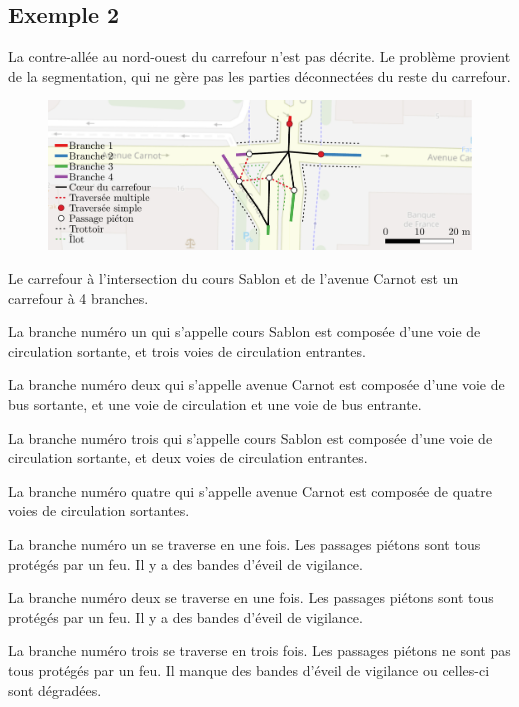 \begin{appendix}
\newpage
\section*{Exemple 2}

La contre-allée au nord-ouest du carrefour n'est pas décrite. Le problème provient de la segmentation, qui ne gère pas les parties déconnectées du reste du carrefour.

\begin{figure}[ht]
  \centering
  \includegraphics[width=\textwidth]{images/annexes/carrefour_master.pdf}
  \label{fig:exemple2}
\end{figure}

Le carrefour à l'intersection du cours Sablon et de l'avenue Carnot est un carrefour à 4 branches.

\newpar{}

La branche numéro un qui s'appelle cours Sablon est composée d'une voie de circulation sortante, et trois voies de circulation entrantes.

La branche numéro deux qui s'appelle avenue Carnot est composée d'une voie de bus sortante, et une voie de circulation et une voie de bus entrante.

La branche numéro trois qui s'appelle cours Sablon est composée d'une voie de circulation sortante, et deux voies de circulation entrantes.

La branche numéro quatre qui s'appelle avenue Carnot est composée de quatre voies de circulation sortantes.

\newpar{}

La branche numéro un se traverse en une fois. Les passages piétons sont tous protégés par un feu. Il y a des bandes d'éveil de vigilance.

La branche numéro deux se traverse en une fois. Les passages piétons sont tous protégés par un feu. Il y a des bandes d'éveil de vigilance.

La branche numéro trois se traverse en trois fois. Les passages piétons ne sont pas tous protégés par un feu. Il manque des bandes d'éveil de vigilance ou celles-ci sont dégradées.


\end{appendix}
